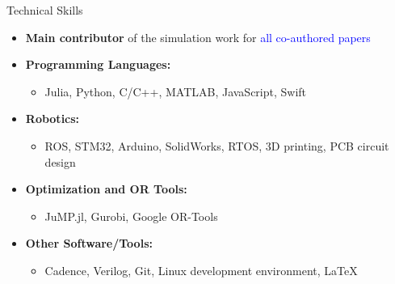 \documentclass{resume} %
\begin{document}
\begin{rSection}{Technical Skills}
    \begin{itemize}
    \item \textbf{Main contributor} of the simulation work for \textcolor{blue}{all co-authored papers}
    \item \textbf{Programming Languages:} 
    \begin{itemize}
        \item Julia, Python, C/C++, MATLAB, JavaScript, Swift
    \end{itemize}    
    \item \textbf{Robotics:} 
    \begin{itemize}
        \item ROS, STM32, Arduino, SolidWorks, RTOS, 3D printing, PCB circuit design
    \end{itemize}
    \item \textbf{Optimization and OR Tools:} 
    \begin{itemize}
        \item JuMP.jl, Gurobi, Google OR-Tools
    \end{itemize}
    \item \textbf{Other Software/Tools:} 
    \begin{itemize}
        \item Cadence, Verilog, Git, Linux development environment, LaTeX
    \end{itemize}
    \end{itemize}
\end{rSection}


\end{document}
